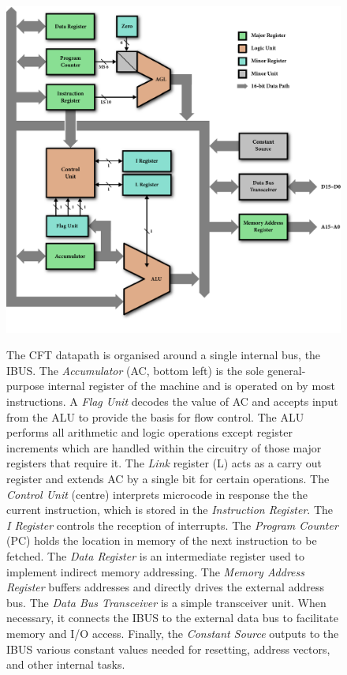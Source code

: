 \documentclass[11pt,a4paper,twocolumns]{article}
\newcommand\bus[1]{{#1}}
\newcommand\unit[1]{{#1}}
\newcommand\IBUS{\bus{IBUS}}
\newcommand\ALU{\unit{ALU}}
\newcommand\register[1]{\textsf{#1}}
\newcommand\A{\register{AC}}
\newcommand\Lreg{\register{L}}
\newcommand\PC{\register{PC}}
\begin{document}
\begin{figure}
\includegraphics[width=\textwidth]{figs/datapath.pdf}\vspace{2em}\\
\caption{\label{fig-datapath} The CFT datapath is organised around a
  single internal bus, the \IBUS. The {\em Accumulator\/} (\A, bottom
  left) is the sole general-purpose internal register of the machine
  and is operated on by most instructions. A {\em Flag Unit\/} decodes
  the value of \A{} and accepts input from the \ALU{} to provide the
  basis for flow control. The \ALU{} performs all arithmetic and logic
  operations except register increments which are handled within the
  circuitry of those major registers that require it. The {\em Link\/}
  register (\Lreg) acts as a carry out register and extends \A{} by a
  single bit for certain operations. The {\em Control Unit\/} (centre)
  interprets microcode in response the the current instruction, which
  is stored in the {\em Instruction Register\/}. The {\em I Register}
  controls the reception of interrupts. The {\em Program Counter\/}
  (\PC) holds the location in memory of the next instruction to be
  fetched. The {\em Data Register\/} is an intermediate register used
  to implement indirect memory addressing. The {\em Memory Address
    Register\/} buffers addresses and directly drives the external
  address bus. The {\em Data Bus Transceiver\/} is a simple
  transceiver unit. When necessary, it connects the \IBUS{} to the
  external data bus to facilitate memory and I/O access. Finally, the
  {\em Constant Source\/} outputs to the \IBUS{} various constant
  values needed for resetting, address vectors, and other internal
  tasks.  }
\end{figure}
\end{document}
